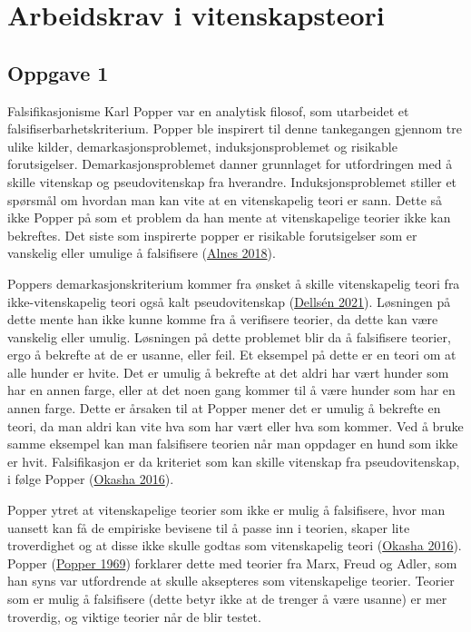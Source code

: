 \documentclass[
]{book}
\begin{document}
\hypertarget{arbeidskrav-i-vitenskapsteori}{%
\chapter{Arbeidskrav i
vitenskapsteori}\label{arbeidskrav-i-vitenskapsteori}}

\hypertarget{oppgave-1}{%
\section{Oppgave 1}\label{oppgave-1}}

Falsifikasjonisme Karl Popper var en analytisk filosof, som utarbeidet
et falsifiserbarhetskriterium. Popper ble inspirert til denne
tankegangen gjennom tre ulike kilder, demarkasjonsproblemet,
induksjonsproblemet og risikable forutsigelser. Demarkasjonsproblemet
danner grunnlaget for utfordringen med å skille vitenskap og
pseudovitenskap fra hverandre. Induksjonsproblemet stiller et spørsmål
om hvordan man kan vite at en vitenskapelig teori er sann. Dette så ikke
Popper på som et problem da han mente at vitenskapelige teorier ikke kan
bekreftes. Det siste som inspirerte popper er risikable forutsigelser
som er vanskelig eller umulige å falsifisere
(\protect\hyperlink{ref-alnes2018}{Alnes 2018}).

Poppers demarkasjonskriterium kommer fra ønsket å skille vitenskapelig
teori fra ikke-vitenskapelig teori også kalt pseudovitenskap
(\protect\hyperlink{ref-dellsuxe9n2021}{Dellsén 2021}). Løsningen på
dette mente han ikke kunne komme fra å verifisere teorier, da dette kan
være vanskelig eller umulig. Løsningen på dette problemet blir da å
falsifisere teorier, ergo å bekrefte at de er usanne, eller feil. Et
eksempel på dette er en teori om at alle hunder er hvite. Det er umulig
å bekrefte at det aldri har vært hunder som har en annen farge, eller at
det noen gang kommer til å være hunder som har en annen farge. Dette er
årsaken til at Popper mener det er umulig å bekrefte en teori, da man
aldri kan vite hva som har vært eller hva som kommer. Ved å bruke samme
eksempel kan man falsifisere teorien når man oppdager en hund som ikke
er hvit. Falsifikasjon er da kriteriet som kan skille vitenskap fra
pseudovitenskap, i følge Popper
(\protect\hyperlink{ref-okasha2016}{Okasha 2016}).

Popper ytret at vitenskapelige teorier som ikke er mulig å falsifisere,
hvor man uansett kan få de empiriske bevisene til å passe inn i teorien,
skaper lite troverdighet og at disse ikke skulle godtas som
vitenskapelig teori (\protect\hyperlink{ref-okasha2016}{Okasha 2016}).
Popper (\protect\hyperlink{ref-popper1969}{Popper 1969}) forklarer dette
med teorier fra Marx, Freud og Adler, som han syns var utfordrende at
skulle aksepteres som vitenskapelige teorier. Teorier som er mulig å
falsifisere (dette betyr ikke at de trenger å være usanne) er mer
troverdig, og viktige teorier når de blir testet.
\end{document}
